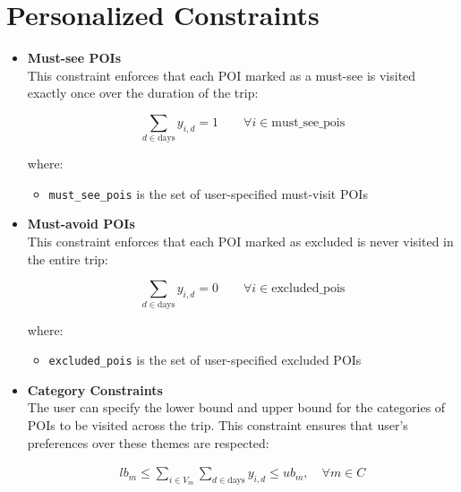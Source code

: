 \documentclass[sigconf,authordraft]{acmart}
\begin{document}
\section{Personalized Constraints}
\begin{itemize}
\item \textbf{Must-see POIs}\\
This constraint enforces that each POI marked as a must-see is visited exactly once over the duration of the trip:

\begin{equation}
\label{mul_day_7}
    \sum_{d \in \text{days}} y_{i,d} = 1 \quad \quad \forall i \in \text{must\_see\_pois}
\end{equation}

where:
\begin{itemize}
  \item \texttt{must\_see\_pois} is the set of user-specified must-visit POIs
\end{itemize}
\item \textbf{Must-avoid POIs}\\
This constraint enforces that each POI marked as excluded is never visited in the entire trip:

\begin{equation}
\label{mul_day_8}
    \sum_{d \in \text{days}} y_{i,d} = 0 \quad \quad \forall i \in \text{excluded\_pois}
\end{equation}

where:
\begin{itemize}
  \item \texttt{excluded\_pois} is the set of user-specified excluded POIs
\end{itemize}
\item \textbf{Category Constraints}\\
The user can specify the lower bound and upper bound for the categories of POIs to be visited across the trip. This constraint ensures that user's preferences over these themes are respected:

\begin{align}
\label{mul_day_11}
lb_m \leq \sum_{i \in V_m} \sum_{d \in \text{days}} y_{i,d} \leq ub_m, \quad \forall m \in C 
\end{align}


\end{itemize}
\end{document}

